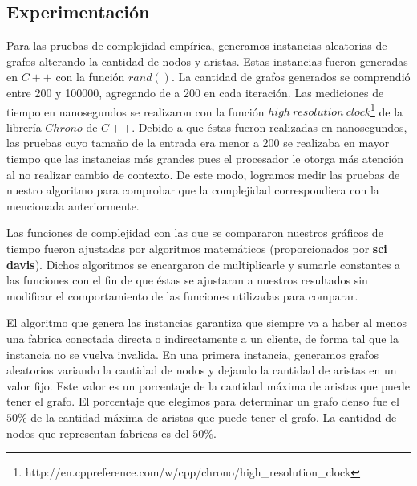 \subsection{Experimentación}
Para las pruebas de complejidad empírica, generamos instancias aleatorias de grafos alterando la cantidad de nodos y aristas. Estas instancias fueron generadas en $C++$ con la función $rand()$. La cantidad de grafos generados se comprendió entre 200 y 100000, agregando de a 200 en cada iteración. Las mediciones de tiempo en nanosegundos se realizaron con la función $high\ resolution\ clock$\footnote{http://en.cppreference.com/w/cpp/chrono/high\_resolution\_clock} de la librería $Chrono$ de $C++$. Debido a que éstas fueron realizadas en nanosegundos, las pruebas cuyo tamaño de la entrada era menor a 200 se realizaba en mayor tiempo que las instancias más grandes pues el procesador le otorga más atención al no realizar cambio de contexto. De este modo, logramos medir las pruebas de nuestro algoritmo para comprobar que la complejidad correspondiera con la mencionada anteriormente.

Las funciones de complejidad con las que se compararon nuestros gráficos de tiempo fueron ajustadas por algoritmos matemáticos (proporcionados por \textbf{sci davis}). Dichos algoritmos se encargaron de multiplicarle y sumarle constantes a las funciones con el fin de que éstas se ajustaran a nuestros resultados sin modificar el comportamiento de las funciones utilizadas para comparar.

El algoritmo que genera las instancias garantiza que siempre va a haber al menos una fabrica conectada directa o indirectamente a un cliente, de forma tal que la instancia no se vuelva invalida.
\newpage
En una primera instancia, generamos grafos aleatorios variando la cantidad de nodos y dejando la cantidad de aristas en un valor fijo. Este valor es un porcentaje de la cantidad máxima de aristas que puede tener el grafo. El porcentaje que elegimos para determinar un grafo denso fue el $50\%$ de la cantidad máxima de aristas que puede tener el grafo. La cantidad de nodos que representan fabricas es del $50\%$.

